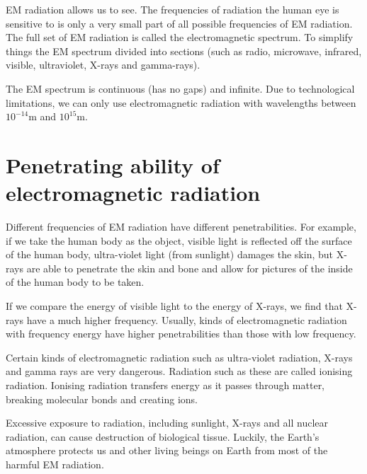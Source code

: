       \label{m38778*id187230}EM radiation allows us to see. The frequencies of radiation the human eye is sensitive to is only a very small part of all possible frequencies of EM radiation. The full set of EM radiation is called the electromagnetic spectrum. To simplify things the EM spectrum divided into sections (such as radio, microwave, infrared, visible, ultraviolet, X-rays and gamma-rays).\par 
      \label{m38778*eip-855}The EM spectrum is continuous (has no gaps) and infinite. Due to technological limitations, we can only use electromagnetic radiation with wavelengths between ${10}^{-14}\text{m}$ and ${10}^{15}\text{m}$.
\label{m38778*secfhsst!!!underscore!!!id117}
           \section{Penetrating ability of electromagnetic radiation}
            \nopagebreak
      \label{m38779*id189450}Different frequencies of EM radiation have different penetrabilities. For example, if we take the human body as the object, visible light is reflected off the surface of the human body, ultra-violet light (from sunlight) damages the skin, but X-rays are able to penetrate the skin and bone and allow for pictures of the inside of the human body to be taken.\par 
      \label{m38779*id189457}If we compare the energy of visible light to the energy of X-rays, we find that X-rays have a much higher frequency. Usually, kinds of electromagnetic radiation with frequency energy have higher penetrabilities than those with low frequency.\par 
      \label{m38779*id189462}Certain kinds of electromagnetic radiation such as ultra-violet radiation, X-rays and gamma rays are very dangerous. Radiation such as these are called ionising radiation. Ionising radiation transfers energy as it passes through matter, breaking molecular bonds and creating ions.\par 
      \label{m38779*id189468}Excessive exposure to radiation, including sunlight, X-rays and all nuclear radiation, can cause destruction of biological tissue. Luckily, the Earth's atmosphere protects us and other living beings on Earth from most of the harmful EM radiation.\par 
      \label{m38779*uid17}

